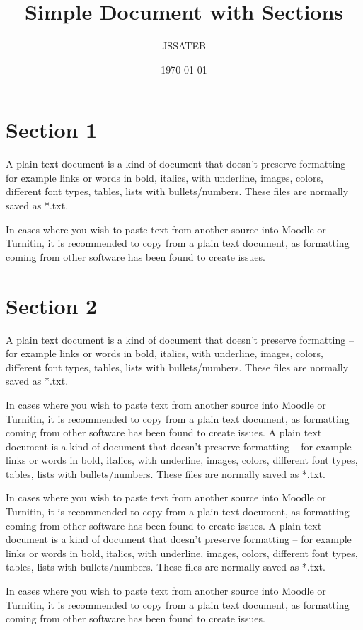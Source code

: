 \documentclass[12pt,a4paper]{article}
\title{Simple Document with Sections}
\author{JSSATEB}
\date{\today}
\begin{document}
	\maketitle
	\thispagestyle{fancy}
	
	\section{Section 1}
		A plain text document is a kind of document that doesn’t preserve formatting – for example links or words in bold, italics, with underline, images, colors, different font types, tables, lists with bullets/numbers. These files are normally saved as *.txt.
		
		In cases where you wish to paste text from another source into Moodle or Turnitin, it is recommended to copy from a plain text document, as formatting coming from other software has been found to create issues.
	
	\section{Section 2}
		A plain text document is a kind of document that doesn’t preserve formatting – for example links or words in bold, italics, with underline, images, colors, different font types, tables, lists with bullets/numbers. These files are normally saved as *.txt.
		
		In cases where you wish to paste text from another source into Moodle or Turnitin, it is recommended to copy from a plain text document, as formatting coming from other software has been found to create issues.
		A plain text document is a kind of document that doesn’t preserve formatting – for example links or words in bold, italics, with underline, images, colors, different font types, tables, lists with bullets/numbers. These files are normally saved as *.txt.
		
		In cases where you wish to paste text from another source into Moodle or Turnitin, it is recommended to copy from a plain text document, as formatting coming from other software has been found to create issues.
		A plain text document is a kind of document that doesn’t preserve formatting – for example links or words in bold, italics, with underline, images, colors, different font types, tables, lists with bullets/numbers. These files are normally saved as *.txt.
		
		In cases where you wish to paste text from another source into Moodle or Turnitin, it is recommended to copy from a plain text document, as formatting coming from other software has been found to create issues.
	
\end{document}

